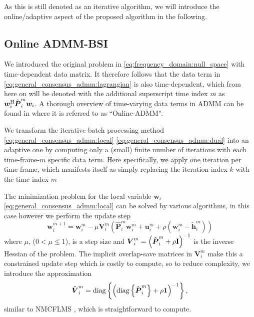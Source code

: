 \documentclass{article}
\newcommand{\hf}{{\bm{h}}}
\newcommand{\wf}{{\bm{w}}}
\newcommand{\uuf}{{\bm{u}}}
\newcommand{\aRhof}{{\bm{{P}}}}
\newcommand{\I}{\mtxb{I}}
\begin{document}
As this is still denoted as an iterative algorithm, we will introduce the online/adaptive aspect of the proposed algorithm in the following.

\subsection{Online ADMM-BSI}
\label{ssec:online_admm}
We introduced the original problem in \eqref{eq:frequency_domain:null_space} with time-dependent data matrix. It therefore follows that the data term in \eqref{eq:general_consensus_admm:lagrangian} is also time-dependent, which from here on will be denoted with the additional superscript time index \(m\) as \(\wf_i^\herm \hat{\aRhof}_i^{m} \wf_i\).
A thorough overview of time-varying data terms in ADMM can be found in \cite{wangOnlineAlternatingDirection2013,hosseiniOnlineDistributedADMM2014} where it is referred to as ``Online-ADMM".

We transform the iterative batch processing method \eqref{eq:general_consensus_admm:local}-\eqref{eq:general_consensus_admm:dual} into an adaptive one by computing only a (small) finite number of iterations with each time-frame-\(m\) specific data term.
Here specifically, we apply one iteration per time frame, which manifests itself as simply replacing the iteration index \(k\) with the time index \(m\)

The minimization problem for the local variable \(\wf_i\) \eqref{eq:general_consensus_admm:local} can be solved by various algorithms, in this case however we perform the update step 
\begin{equation}
    \wf_i^{m+1} = \wf_i^{m} - \mu \bm{{V}}_i^m \left( \hat{\aRhof}_i^m \wf_i^m + \uuf_i^m + \rho\left(\wf_i^m - \tilde{\hf}_i^{m}\right)\right)\label{eq:online_admm:local_update}
\end{equation}
where \(\mu\), (\(0  < \mu\leq 1\)), is a step size and \(\bm{{V}}_i^m = \left(\hat{\aRhof}_i^m + \rho \I \right)^{-1}\) is the inverse Hessian of the problem.
The implicit overlap-save matrices in \(\bm{{V}}_i^m\) make this a constrained update step which is costly to compute, so to reduce complexity, we introduce the approximation
\begin{equation}
    \tilde{\bm{{V}}}_i^m = \operatorname{diag} \left\{ \left( \operatorname{diag} \left\{ \hat{\aRhof}_i^m \right\} + \rho \mtxb{1} \right)^{-1}\right\},
\end{equation}
similar to NMCFLMS \cite{huangClassFrequencydomainAdaptive2003}, which is straightforward to compute.
\end{document}
